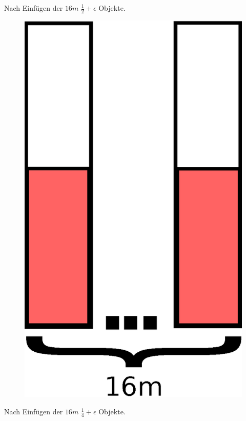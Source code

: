 \documentclass{article}
\begin{document}
\begin{multicols}{2}
Nach Einfügen der $16m$ $\frac{1}{2}+\epsilon$ Objekte. 
\begin{figure}[H]
\begin{center}
	\includegraphics[scale=.3]{first}
\end{center}
\end{figure}
\columnbreak%
Nach Einfügen der $16m$ $\frac{1}{4}+\epsilon$ Objekte. 
\begin{figure}[H]
\begin{center}

\end{center}
\end{figure}
\end{multicols}
\end{document}
